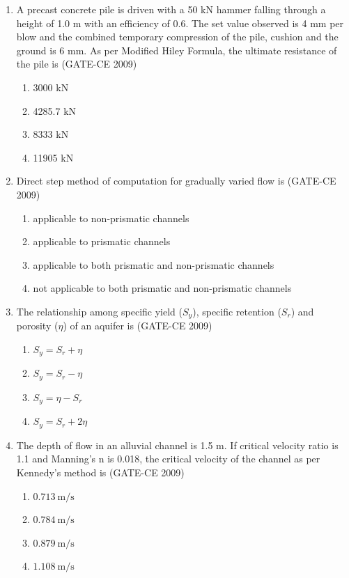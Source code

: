 \documentclass[journal,12pt,onecolumn]{article}
\theoremstyle{remark}
\begin{document}
\begin{enumerate}
    \item A precast concrete pile is driven with a 50 kN hammer falling through a height of 1.0 m with an efficiency of 0.6. The set value observed is 4 mm per blow and the combined temporary compression of the pile, cushion and the ground is 6 mm. As per Modified Hiley Formula, the ultimate resistance of the pile is (GATE-CE 2009)
    \begin{multicols}{2}
    \begin{enumerate}
        \item 3000 kN 
        \item 4285.7 kN 
        \item 8333 kN 
        \item 11905 kN
    \end{enumerate}
    \end{multicols}
    
    \item Direct step method of computation for gradually varied flow is (GATE-CE 2009)
    \begin{enumerate}
        \item applicable to non-prismatic channels
        \item applicable to prismatic channels
        \item applicable to both prismatic and non-prismatic channels
        \item not applicable to both prismatic and non-prismatic channels
    \end{enumerate}
    
    \item The relationship among specific yield ($S_y$), specific retention ($S_r$) and porosity ($\eta$) of an aquifer is (GATE-CE 2009)
    \begin{multicols}{2}
    \begin{enumerate}
        \item $S_y = S_r + \eta$ 
         \item $S_y = S_r - \eta$ 
        \item $S_y = \eta - S_r$ 
        \item $S_y = S_r + 2\eta$
    \end{enumerate}
    \end{multicols}
    
    \item The depth of flow in an alluvial channel is 1.5 m. If critical velocity ratio is 1.1 and Manning's n is 0.018, the critical velocity of the channel as per Kennedy's method is (GATE-CE 2009)
    \begin{multicols}{2}
    \begin{enumerate}
        \item $0.713~\mathrm{m/s}$
        \item $0.784~\mathrm{m/s}$
        \item $0.879~\mathrm{m/s}$
        \item $1.108~\mathrm{m/s}$
    \end{enumerate}
    \end{multicols}
    

\end{enumerate}
\end{document}
